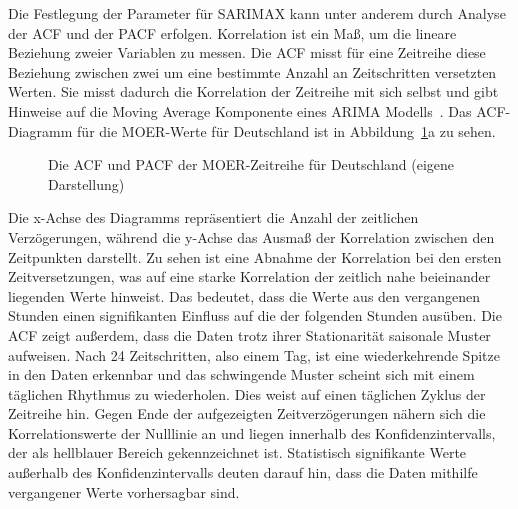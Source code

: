 Die Festlegung der Parameter für \ac{SARIMAX} kann unter anderem durch Analyse der \ac{ACF} und der \ac{PACF} erfolgen.
Korrelation ist ein Maß, um die lineare Beziehung zweier Variablen zu messen.
Die \ac{ACF} misst für eine Zeitreihe diese Beziehung zwischen zwei um eine bestimmte Anzahl an Zeitschritten versetzten Werten.
Sie misst dadurch die Korrelation der Zeitreihe mit sich selbst und gibt Hinweise auf die Moving Average Komponente eines \ac{ARIMA} Modells~\cite{Peixeiro.2022}.
Das \ac{ACF}-Diagramm für die \ac{MOER}-Werte für Deutschland ist in Abbildung~\ref{FIG:acf_pacf_moer_de}a zu sehen.
\begin{figure}
 \centering
 \qquad
 \caption[ACF und PACF der MOER Deutschlands]{Die \ac{ACF} und \ac{PACF} der \ac{MOER}-Zeitreihe für Deutschland (eigene Darstellung)}%
 \label{FIG:acf_pacf_moer_de}%
\end{figure}
Die x-Achse des Diagramms repräsentiert die Anzahl der zeitlichen Verzögerungen, während die y-Achse das Ausmaß der Korrelation zwischen den Zeitpunkten darstellt.
Zu sehen ist eine Abnahme der Korrelation bei den ersten Zeitversetzungen, was auf eine starke Korrelation der zeitlich nahe beieinander liegenden Werte hinweist.
Das bedeutet, dass die Werte aus den vergangenen Stunden einen signifikanten Einfluss auf die der folgenden Stunden ausüben.
Die \ac{ACF} zeigt außerdem, dass die Daten trotz ihrer Stationarität saisonale Muster aufweisen.
Nach 24 Zeitschritten, also einem Tag, ist eine wiederkehrende Spitze in den Daten erkennbar und das schwingende Muster scheint sich mit einem täglichen Rhythmus zu wiederholen.
Dies weist auf einen täglichen Zyklus der Zeitreihe hin.
Gegen Ende der aufgezeigten Zeitverzögerungen nähern sich die Korrelationswerte der Nulllinie an und liegen innerhalb des Konfidenzintervalls, der als hellblauer Bereich gekennzeichnet ist.
Statistisch signifikante Werte außerhalb des Konfidenzintervalls deuten darauf hin, dass die Daten mithilfe vergangener Werte vorhersagbar sind.

